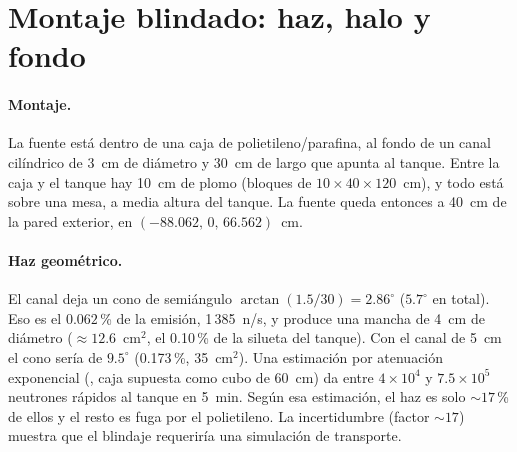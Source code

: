 \documentclass[11pt,a4paper]{article}
\begin{document}
\section{Montaje blindado: haz, halo y fondo}
\label{sec:blindado}

\paragraph{Montaje.} La fuente está dentro de una caja de polietileno/parafina, al fondo de un canal
cilíndrico de 3~cm de diámetro y 30~cm de largo que apunta al tanque. Entre la caja y el tanque hay
10~cm de plomo (bloques de $10\times40\times120$~cm), y todo está sobre una mesa, a media altura del
tanque. La fuente queda entonces a 40~cm de la pared exterior, en $(-88.062,\,0,\,66.562)$~cm.

\paragraph{Haz geométrico.} El canal deja un cono de semiángulo $\arctan(1.5/30)=2.86^\circ$
($5.7^\circ$ en total). Eso es el $0.062$\,\% de la emisión, 1\,385~n/s, y produce una mancha de 4~cm
de diámetro ($\approx12.6$~cm$^2$, el 0.10\,\% de la silueta del tanque). Con el canal de 5~cm el cono
sería de $9.5^\circ$ (0.173\,\%, 35~cm$^2$). Una estimación por atenuación exponencial
(, caja supuesta como cubo de 60~cm) da entre $4\times10^4$ y
$7.5\times10^5$ neutrones rápidos al tanque en 5~min. Según esa estimación, el haz es solo
${\sim}17$\,\% de ellos y el resto es fuga por el polietileno. La incertidumbre (factor ${\sim}17$)
muestra que el blindaje requeriría una simulación de transporte.
\end{document}
